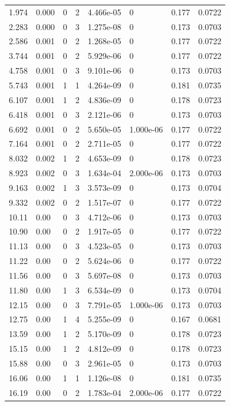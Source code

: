 \documentclass[preview]{standalone}
\begin{document}
{{\begin{tabular}{L{1.2cm}C{1.2cm} C{0.3cm}C{0.5cm} C{1.4cm}C{1.4cm} C{1.4cm}C{1.4cm}}
  1.974  &  0.000  & 0     &  2 &  4.466e-05  & 0  & 0.177 &  0.0722   \\ 
  2.283  &  0.000  & 0     &  3 &  1.275e-08  & 0  & 0.173 &  0.0703   \\ 
  2.586  &  0.001  & 0     &  2 &  1.268e-05  & 0  & 0.177 &  0.0722   \\ 
  3.744  &  0.001  & 0     &  2 &  5.929e-06  & 0  & 0.177 &  0.0722   \\ 
  4.758  &  0.001  & 0     &  3 &  9.101e-06  & 0  & 0.173 &  0.0703   \\ 
  5.743  &  0.001  & 1     &  1 &  4.264e-09  & 0  & 0.181 &  0.0735   \\ 
  6.107  &  0.001  & 1     &  2 &  4.836e-09  & 0  & 0.178 &  0.0723   \\ 
  6.418  &  0.001  & 0     &  3 &  2.121e-06  & 0  & 0.173 &  0.0703   \\ 
  6.692  &  0.001  & 0     &  2 &  5.650e-05  & 1.000e-06  & 0.177 &  0.0722   \\ 
  7.164  &  0.001  & 0     &  2 &  2.711e-05  & 0  & 0.177 &  0.0722   \\ 
  8.032  &  0.002  & 1     &  2 &  4.653e-09  & 0  & 0.178 &  0.0723   \\ 
  8.923  &  0.002  & 0     &  3 &  1.634e-04  & 2.000e-06  & 0.173 &  0.0703   \\ 
  9.163  &  0.002  & 1     &  3 &  3.573e-09  & 0  & 0.173 &  0.0704   \\ 
  9.332  &  0.002  & 0     &  2 &  1.517e-07  & 0  & 0.177 &  0.0722   \\ 
  10.11  &  0.00  & 0     &  3 &  4.712e-06  & 0  & 0.173 &  0.0703   \\ 
  10.90  &  0.00  & 0     &  2 &  1.917e-05  & 0  & 0.177 &  0.0722   \\ 
  11.13  &  0.00  & 0     &  3 &  4.523e-05  & 0  & 0.173 &  0.0703   \\ 
  11.22  &  0.00  & 0     &  2 &  5.624e-06  & 0  & 0.177 &  0.0722   \\ 
  11.56  &  0.00  & 0     &  3 &  5.697e-08  & 0  & 0.173 &  0.0703   \\ 
  11.80  &  0.00  & 1     &  3 &  6.534e-09  & 0  & 0.173 &  0.0704   \\ 
  12.15  &  0.00  & 0     &  3 &  7.791e-05  & 1.000e-06  & 0.173 &  0.0703   \\ 
  12.75  &  0.00  & 1     &  4 &  5.255e-09  & 0  & 0.167 &  0.0681   \\ 
  13.59  &  0.00  & 1     &  2 &  5.170e-09  & 0  & 0.178 &  0.0723   \\ 
  15.15  &  0.00  & 1     &  2 &  4.812e-09  & 0  & 0.178 &  0.0723   \\ 
  15.88  &  0.00  & 0     &  3 &  2.961e-05  & 0  & 0.173 &  0.0703   \\ 
  16.06  &  0.00  & 1     &  1 &  1.126e-08  & 0  & 0.181 &  0.0735   \\ 
  16.19  &  0.00  & 0     &  2 &  1.783e-04  & 2.000e-06  & 0.177 &  0.0722   \\ 
\hline 
\end{tabular} 

}}
\end{document}
